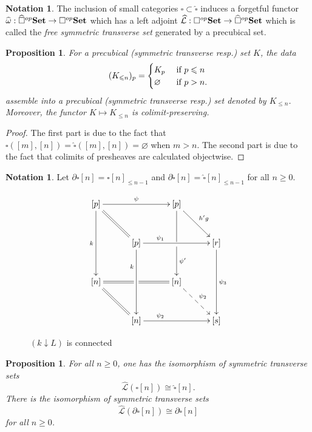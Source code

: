\documentclass[a4paper,12pt]{amsart}
\newcommand{\de}{\partial}
\newtheorem{prop}[thm]{Proposition}
\newcommand{\bp}{\begin{prop}}
\newcommand{\ep}{\end{prop}}
\newcommand{\bpf}{\begin{proof}}
\newcommand{\epf}{\end{proof}}
\theoremstyle{definition}
\newtheorem{nota}[thm]{Notation}
\newcommand{\iso}{\cong}
\renewcommand{\leq}{\leqslant}
\renewcommand{\geq}{\geqslant}
\newcommand{\brm}[1]{{\rm{\mathbf{#1}}}}
\newcommand{\set}{{\brm{Set}}}
\newcommand{\ddownarrow}{{\downarrow}}
\begin{document}
\begin{nota} \label{free-transverse}
	The inclusion of small categories $\square\subset \widehat{\square}$ induces a forgetful functor $\widehat{\omega}:\widehat{\square}^{op}\set \to \square^{op}\set$ which has a left adjoint $\widehat{\mathcal{L}}:\square^{op}\set \to \widehat{\square}^{op}\set$ which is called the \textit{free symmetric transverse set} generated by a precubical set. 
\end{nota}

\bp \label{restriction}
	For a precubical (symmetric transverse resp.) set $K$, the data
	\[
	(K_{\leq n})_p = \begin{cases}
		K_p & \hbox{ if }p\leq n\\
		\varnothing & \hbox{ if }p> n.
	\end{cases}
	\]
	assemble into a precubical (symmetric transverse resp.) set denoted by $K_{\leq n}$. Moreover, the functor $K \mapsto K_{\leq n}$ is colimit-preserving.
\ep 

\bpf
The first part is due to the fact that $\square([m],[n])=\widehat{\square}([m],[n]) = \varnothing$ when $m>n$. The second part is due to the fact that colimits of presheaves are calculated objectwise.
\epf


\begin{nota}
	Let $\de\square[n] = \square[n]_{\leq n-1}$ and $\de\widehat{\square}[n]=\widehat{\square}[n]_{\leq n-1}$ for all $n\geq 0$.
\end{nota}

\begin{figure}
	\[{
		\xymatrix@C=3em@R=3em{ [p]
			\ar@{=}[rd] \ar@{->}[dd]_-{k} \ar@{->}[rr]^-{\psi} && [p]
			\ar@{->}[rd]^-{h'g} \ar@{->}'[d][dd]^-{\psi'}  &\\
			& [p] \ar@{->}[rr]^(0.3){\psi_1} \ar@{->}[dd]_(0.3){k} && [r] \ar@{->}[dd]^-{\psi_3} \\
			[n] \ar@{=}[rd] \ar@{=}'[r][rr] &&
			[n] \ar@{-->}[rd]^-{\psi_2}& \\
			& [n] \ar@{->}[rr]^(0.3){\psi_2} &&
			[s]
		}
	} \]
	\caption{$(k\ddownarrow L)$ is connected}
	\label{terminal}
\end{figure}

\bp \label{free_square}
For all $n\geq 0$, one has the isomorphism of symmetric transverse sets \[\widehat{\mathcal{L}}(\square[n]) \iso \widehat{\square}[n].\] There is the isomorphism of symmetric transverse sets \[\widehat{\mathcal{L}}(\de\square[n]) \iso \de\widehat{\square}[n]\] for all $n\geq 0$. 
\ep
\end{document}
